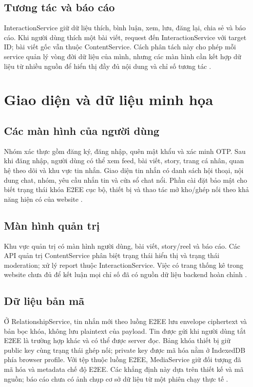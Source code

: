 \subsection{Tương tác và báo cáo}
InteractionService giữ dữ liệu thích, bình luận, xem, lưu, đăng lại, chia sẻ và báo cáo. Khi người dùng thích một bài viết, request đến InteractionService với target ID; bài viết gốc vẫn thuộc ContentService. Cách phân tách này cho phép mỗi service quản lý vòng đời dữ liệu của mình, nhưng các màn hình cần kết hợp dữ liệu từ nhiều nguồn để hiển thị đầy đủ nội dung và chỉ số tương tác \cite{catalog}.


\section{Giao diện và dữ liệu minh họa}
\subsection{Các màn hình của người dùng}
Nhóm xác thực gồm đăng ký, đăng nhập, quên mật khẩu và xác minh OTP. Sau khi đăng nhập, người dùng có thể xem feed, bài viết, story, trang cá nhân, quan hệ theo dõi và khu vực tin nhắn. Giao diện tin nhắn có danh sách hội thoại, nội dung chat, nhóm, yêu cầu nhắn tin và cửa sổ chat nổi. Phần cài đặt bảo mật cho biết trạng thái khóa E2EE cục bộ, thiết bị và thao tác mở kho/ghép nối theo khả năng hiện có của website \cite{usecases,e2ee}.

\subsection{Màn hình quản trị}
Khu vực quản trị có màn hình người dùng, bài viết, story/reel và báo cáo. Các API quản trị ContentService phân biệt trạng thái hiển thị và trạng thái moderation; xử lý report thuộc InteractionService. Việc có trang thống kê trong website chưa đủ để kết luận mọi chỉ số đã có nguồn dữ liệu backend hoàn chỉnh \cite{catalog,usecases}.

\subsection{Dữ liệu bản mã}
Ở RelationshipService, tin nhắn mới theo luồng E2EE lưu envelope ciphertext và bản bọc khóa, không lưu plaintext của payload. Tin được gửi khi người dùng tắt E2EE là trường hợp khác và có thể được server đọc. Bảng khóa thiết bị giữ public key cùng trạng thái ghép nối; private key được mã hóa nằm ở IndexedDB phía browser profile. Với tệp thuộc luồng E2EE, MediaService giữ đối tượng đã mã hóa và metadata chế độ E2EE. Các khẳng định này dựa trên thiết kế và mã nguồn; báo cáo chưa có ảnh chụp cơ sở dữ liệu từ một phiên chạy thực tế \cite{e2ee}.
